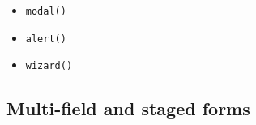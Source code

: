\begin{itemize}
  \begin{itemize}
  \tightlist
  \item
    \texttt{m\allowbreak{}o\allowbreak{}d\allowbreak{}a\allowbreak{}l\allowbreak{}(\allowbreak{})}
  \item
    \texttt{a\allowbreak{}l\allowbreak{}e\allowbreak{}r\allowbreak{}t\allowbreak{}(\allowbreak{})}
  \item
    \texttt{w\allowbreak{}i\allowbreak{}z\allowbreak{}a\allowbreak{}r\allowbreak{}d\allowbreak{}(\allowbreak{})}
  \end{itemize}
\end{itemize}

\subsection{Multi-field and staged forms}\label{record-019-multi-field-and-staged-forms}

